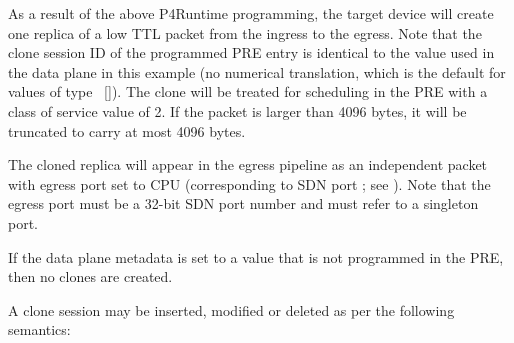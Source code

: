 \documentclass[11pt]{article}
\begin{document}
{%
\noindent{}As a result of the above P4Runtime programming, the target device will create
one replica of a low TTL packet from the ingress to the egress. Note that the
clone session ID of the programmed PRE entry is identical to the value used in
the data plane in this example (no numerical translation, which is the default
for values of type ~[]). The clone will be
treated for scheduling in the PRE with a class of service value of 2. If the
packet is larger than 4096 bytes, it will be truncated to carry at most 4096
bytes.%

The cloned replica will appear in the egress pipeline as an independent packet
with egress port set to CPU (corresponding to SDN port ; see
). Note that the
egress port must be a 32-bit SDN port number and must refer to a singleton port.%

If the  data plane metadata is set to a value that is not
programmed in the PRE, then no clones are created.%

A clone session may be inserted, modified or deleted as per the following
semantics:%

\begin{itemize}[noitemsep,topsep=\mdcompacttopsep]%


\end{itemize}}
\end{document}
